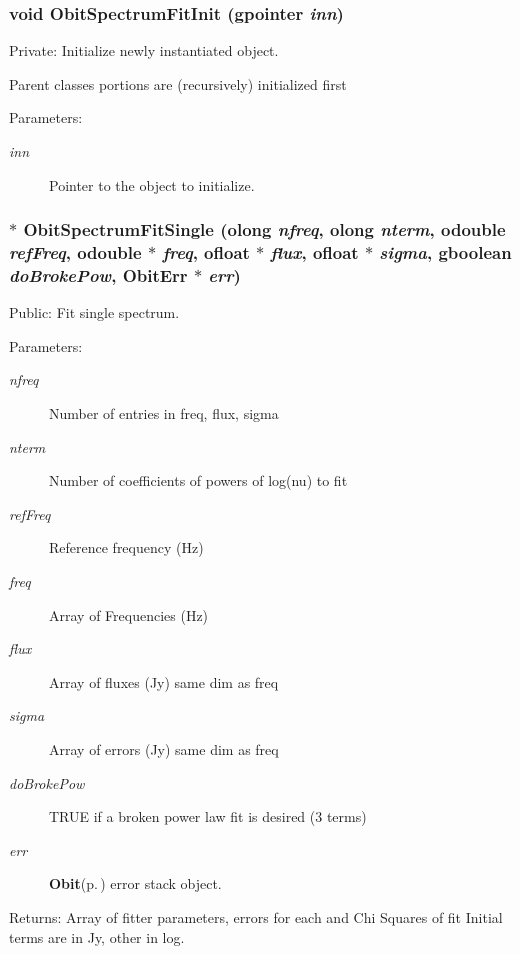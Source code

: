 \subsubsection{\setlength{\rightskip}{0pt plus 5cm}void Obit\-Spectrum\-Fit\-Init (gpointer {\em inn})}\label{ObitSpectrumFit_8c_a3}


Private: Initialize newly instantiated object. 

Parent classes portions are (recursively) initialized first \begin{Desc}
\item[Parameters:]
\begin{description}
\item[{\em inn}]Pointer to the object to initialize. \end{description}
\end{Desc}
\subsubsection{$\ast$ Obit\-Spectrum\-Fit\-Single ({\bf olong} {\em nfreq}, {\bf olong} {\em nterm}, {\bf odouble} {\em ref\-Freq}, {\bf odouble} $\ast$ {\em freq}, {\bf ofloat} $\ast$ {\em flux}, {\bf ofloat} $\ast$ {\em sigma}, gboolean {\em do\-Broke\-Pow}, {\bf Obit\-Err} $\ast$ {\em err})}\label{ObitSpectrumFit_8c_a19}


Public: Fit single spectrum. 

\begin{Desc}
\item[Parameters:]
\begin{description}
\item[{\em nfreq}]Number of entries in freq, flux, sigma \item[{\em nterm}]Number of coefficients of powers of log(nu) to fit \item[{\em ref\-Freq}]Reference frequency (Hz) \item[{\em freq}]Array of Frequencies (Hz) \item[{\em flux}]Array of fluxes (Jy) same dim as freq \item[{\em sigma}]Array of errors (Jy) same dim as freq \item[{\em do\-Broke\-Pow}]TRUE if a broken power law fit is desired (3 terms) \item[{\em err}]{\bf Obit}{\rm (p.\,\pageref{structObit})} error stack object. \end{description}
\end{Desc}
\begin{Desc}
\item[Returns:]Array of fitter parameters, errors for each and Chi Squares of fit Initial terms are in Jy, other in log. \end{Desc}
